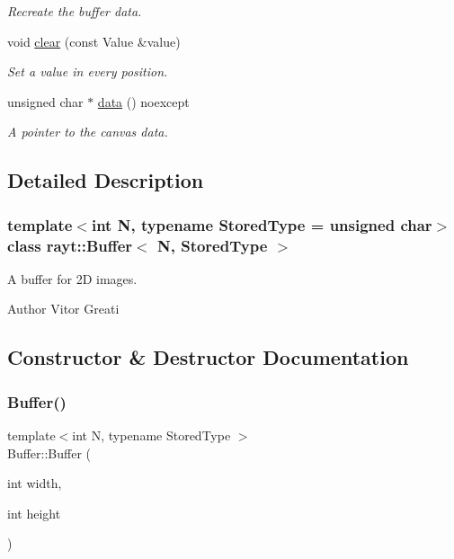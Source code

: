 \begin{DoxyCompactItemize}
\begin{DoxyCompactList}\small\item\em Recreate the buffer data. \end{DoxyCompactList}\item 
void \mbox{\hyperlink{classrayt_1_1_buffer_a817affcd52f40b49c3f8e3417747de3d}{clear}} (const Value \&value)
\begin{DoxyCompactList}\small\item\em Set a value in every position. \end{DoxyCompactList}\item 
unsigned char $\ast$ \mbox{\hyperlink{classrayt_1_1_buffer_a286e9c67444c67b3dc5734d0127549db}{data}} () noexcept
\begin{DoxyCompactList}\small\item\em A pointer to the canvas data. \end{DoxyCompactList}\end{DoxyCompactItemize}


\subsection{Detailed Description}
\subsubsection*{template$<$int N, typename Stored\+Type = unsigned char$>$\newline
class rayt\+::\+Buffer$<$ N, Stored\+Type $>$}

A buffer for 2D images. 

\begin{DoxyAuthor}{Author}
Vitor Greati 
\end{DoxyAuthor}


\subsection{Constructor \& Destructor Documentation}
\mbox{\label{classrayt_1_1_buffer_aea5eaa6530d6506d47a4efee72485c42}} 
\subsubsection{\texorpdfstring{Buffer()}{Buffer()}}
{\footnotesize\ttfamily template$<$int N, typename Stored\+Type $>$ \\
Buffer\+::\+Buffer (\begin{DoxyParamCaption}\item[{int}]{width,  }\item[{int}]{height }\end{DoxyParamCaption})}



